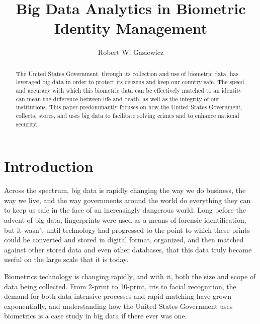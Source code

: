 \documentclass[sigconf]{acmart}
\begin{document}
\title{Big Data Analytics in Biometric Identity Management}


\author{Robert W. Gasiewicz}

\begin{abstract}
The United States Government, through its collection and use of biometric data, has leveraged big data in order to protect its citizens and keep our country safe. The speed and accuracy with which this biometric data can be effectively matched to an identity can mean the difference between life and death, as well as the integrity of our institutions. This paper predominantly focuses on how the United States Government, collects, stores, and uses big data to facilitate solving crimes and to enhance national security. 
\end{abstract}



\maketitle

\section{Introduction}

Across the spectrum, big data is rapidly changing the way we do business, the way we live, and the way governments around the world do everything they can to keep us safe in the face of an increasingly dangerous world. Long before the advent of big data, fingerprints were used as a means of forensic identification, but it wasn't until technology had progressed to the point to which these prints could be converted and stored in digital format, organized, and then matched against other stored data and even other databases, that this data truly became useful on the large scale that it is today. 

Biometrics technology is changing rapidly, and with it, both the size and scope of data being collected. From 2-print to 10-print, iris to facial recognition, the demand for both data intensive processes and rapid matching have grown exponentially, and understanding how the United States Government uses biometrics is a case study in big data if there ever was one. 
\end{document}
